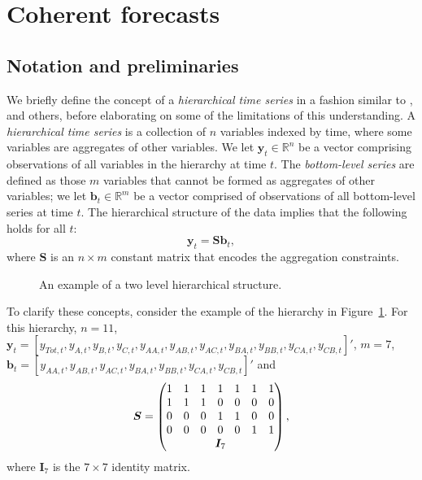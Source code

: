 \documentclass[12pt]{article}
\theoremstyle{definition}
\begin{document}
\section{Coherent forecasts}\label{sec:CoheForecasts}

\subsection{Notation and preliminaries}\label{sec:notation}

We briefly define the concept of a \emph{hierarchical time series} in a fashion similar to \citet{AthEtAl2019_MacroBook}, \citet{FPP2018} and others, before elaborating on some of the limitations of this understanding. A \emph{hierarchical time series} is a collection of $n$ variables indexed by time, where some variables are aggregates of other variables. We let $\bm{y}_t \in \mathbb{R}^n$ be a vector comprising observations of all variables in the hierarchy at time $t$. The \emph{bottom-level series} are defined as those $m$ variables that cannot be formed as aggregates of other variables; we let $\bm{b}_t \in \mathbb{R}^m$ be a vector comprised of observations of all bottom-level series at time $t$. The hierarchical structure of the data implies that the following holds for all $t$:
\begin{equation*}
  \bm{y}_t = \bm{S}\bm{b}_t,
\end{equation*}
where $\bm{S}$ is an $n \times m$ constant matrix that encodes the aggregation constraints.

\begin{figure}[H]
	\begin{center}
		  
		 
		 
		\qobitree
	\end{center}
	\caption{An example of a two level hierarchical structure.}\label{fig:basichier}
\end{figure}

To clarify these concepts, consider the example of the hierarchy in Figure~\ref{fig:basichier}. For this hierarchy, $n=11$, $\bm{y}_t = [y_{Tot,t},y_{A,t}, y_{B,t},y_{C,t},y_{AA,t}, y_{AB,t}, y_{AC,t}, y_{BA,t}, y_{BB,t}, y_{CA,t}, y_{CB,t}]'$, $m=7$, $\bm{b}_t = [y_{AA,t}, y_{AB,t}, y_{AC,t}, y_{BA,t}, y_{BB,t}, y_{CA,t}, y_{CB,t}]'$ and
\[
  \bm{S} = \begin{pmatrix}
    1 & 1 & 1 & 1 & 1 & 1 & 1 \\
    1 & 1 & 1 & 0 & 0 & 0 & 0 \\
    0 & 0 & 0 & 1 & 1 & 0 & 0 \\
    0 & 0 & 0 & 0 & 0 & 1 & 1 \\
    & \multicolumn{5}{c}{\bm{I}_7} &
  \end{pmatrix},
\]
where $\bm{I}_7$ is the $7 \times 7$ identity matrix.
\end{document}

